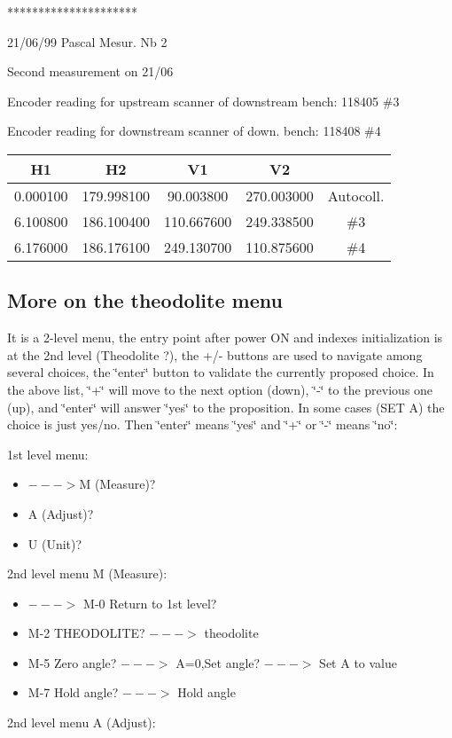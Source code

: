{*}{*}{*}{*}{*}{*}{*}{*}{*}{*}{*}{*}{*}{*}{*}{*}{*}{*}{*}{*}{*} 

21/06/99 Pascal Mesur. Nb 2 

Second measurement on 21/06 

Encoder reading for upstream scanner of downstream bench: 118405 \#3 

Encoder reading for downstream scanner of down. bench: 118408 \#4

\vspace{0.3cm}
{\centering \begin{tabular}{|c|c|c|c|c|}
\hline 
H1&
H2&
V1&
V2&
\\
\hline 
\hline 
0.000100&
179.998100&
90.003800&
270.003000&
Autocoll.\\
\hline 
6.100800&
186.100400&
110.667600 &
249.338500&
\#3\\
\hline 
6.176000&
186.176100&
249.130700&
110.875600 &
\#4 \\
\hline 
\end{tabular}\par}
\vspace{0.3cm}


\subsection{More on the theodolite menu }

It is a 2-level menu, the entry point after power ON and indexes initialization
is at the 2nd level (Theodolite ?), the +/- buttons are used to navigate among
several choices, the \char`\"{}enter\char`\"{} button to validate the currently
proposed choice. In the above list, \char`\"{}+\char`\"{} will move to the next
option (down), \char`\"{}-\char`\"{} to the previous one (up), and \char`\"{}enter\char`\"{}
will answer \char`\"{}yes\char`\"{} to the proposition. In some cases (SET A)
the choice is just yes/no. Then \char`\"{}enter\char`\"{} means \char`\"{}yes\char`\"{}
and \char`\"{}+\char`\"{} or \char`\"{}-\char`\"{} means \char`\"{}no\char`\"{}:

1st level menu: 

\begin{itemize}
\item $--->$M (Measure)? 
\item A (Adjust)? 
\item U (Unit)?
\end{itemize}
2nd level menu M (Measure): 

\begin{itemize}
\item $--->$ M-0 Return to 1st level? 
\item M-2 THEODOLITE? $--->$ theodolite 
\item M-5 Zero angle? $--->$ A=0,Set angle? $--->$ Set A to value 
\item M-7 Hold angle? $--->$ Hold angle
\end{itemize}
2nd level menu A (Adjust): 


